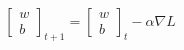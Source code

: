 \documentclass[preview]{standalone}
\begin{document}
\begin{align*}
\begin{bmatrix} w \\ b \end{bmatrix}_{t+1} = \begin{bmatrix} w \\ b \end{bmatrix}_{t} - \alpha \nabla L
\end{align*}
\end{document}
